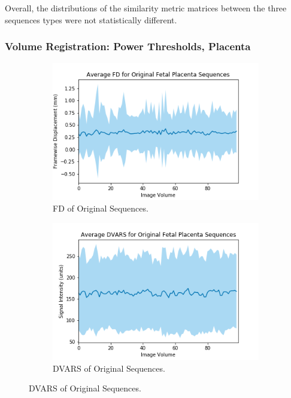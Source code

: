 Overall, the distributions of the similarity metric matrices between the three sequences types were not statistically different.

\subsubsection{Volume Registration: Power Thresholds, Placenta}

\begin{figure}[]
	\centering
	\begin{subfigure}{0.4\textwidth}
		\centering
		\includegraphics[width=1.0\textwidth]{6/figures/fetal-placenta-bold-fd-150.png}
		\caption{FD of Original Sequences.}
	\end{subfigure}
	\hspace{0.05\textwidth}
	\begin{subfigure}{0.4\textwidth}
		\centering
		\includegraphics[width=1.0\textwidth]{6/figures/fetal-placenta-bold-dvars-150.png}
		\caption{DVARS of Original Sequences.}
	\end{subfigure}
	

\end{figure}
